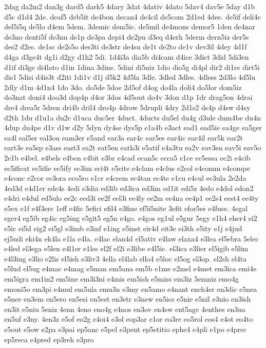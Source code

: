 {2dag
da2m2
dan3g
dard5
dark5
4dary
3dat
4dativ
4dato
5dav4
dav5e
5day
d1b
d5c
d1d4
2de.
deaf5
deb5it
de4bon
decan4
de4cil
de5com
2d1ed
4dee.
de5if
deli4e
del5i5q
de5lo
d4em
5dem.
3demic
dem5ic.
de5mil
de4mons
demor5
1den
de4nar
de3no
denti5f
de3nu
de1p
de3pa
depi4
de2pu
d3eq
d4erh
5derm
dern5iz
der5s
des2
d2es.
de1sc
de2s5o
des3ti
de3str
de4su
de1t
de2to
de1v
dev3il
4dey
4d1f
d4ga
d3ge4t
dg1i
d2gy
d1h2
5di.
1d4i3a
dia5b
di4cam
d4ice
3dict
3did
5di3en
d1if
di3ge
di4lato
d1in
1dina
3dine.
5dini
di5niz
1dio
dio5g
di4pl
dir2
di1re
dirt5i
dis1
5disi
d4is3t
d2iti
1di1v
d1j
d5k2
4d5la
3dle.
3dled
3dles.
4dless
2d3lo
4d5lu
2dly
d1m
4d1n4
1do
3do.
do5de
5doe
2d5of
d4og
do4la
doli4
do5lor
dom5iz
do3nat
doni4
doo3d
dop4p
d4or
3dos
4d5out
do4v
3dox
d1p
1dr
drag5on
4drai
dre4
drea5r
5dren
dri4b
dril4
dro4p
4drow
5drupli
4dry
2d1s2
ds4p
d4sw
d4sy
d2th
1du
d1u1a
du2c
d1uca
duc5er
4duct.
4ducts
du5el
du4g
d3ule
dum4be
du4n
4dup
du4pe
d1v
d1w
d2y
5dyn
dy4se
dys5p
e1a4b
e3act
ead1
ead5ie
ea4ge
ea5ger
ea4l
eal5er
eal3ou
eam3er
e5and
ear3a
ear4c
ear5es
ear4ic
ear4il
ear5k
ear2t
eart3e
ea5sp
e3ass
east3
ea2t
eat5en
eath3i
e5atif
e4a3tu
ea2v
eav3en
eav5i
eav5o
2e1b
e4bel.
e4bels
e4ben
e4bit
e3br
e4cad
ecan5c
ecca5
e1ce
ec5essa
ec2i
e4cib
ec5ificat
ec5ifie
ec5ify
ec3im
eci4t
e5cite
e4clam
e4clus
e2col
e4comm
e4compe
e4conc
e2cor
ec3ora
eco5ro
e1cr
e4crem
ec4tan
ec4te
e1cu
e4cul
ec3ula
2e2da
4ed3d
e4d1er
ede4s
4edi
e3dia
ed3ib
ed3ica
ed3im
ed1it
edi5z
4edo
e4dol
edon2
e4dri
e4dul
ed5ulo
ee2c
eed3i
ee2f
eel3i
ee4ly
ee2m
ee4na
ee4p1
ee2s4
eest4
ee4ty
e5ex
e1f
e4f3ere
1eff
e4fic
5efici
efil4
e3fine
ef5i5nite
3efit
efor5es
e4fuse.
4egal
eger4
eg5ib
eg4ic
eg5ing
e5git5
eg5n
e4go.
e4gos
eg1ul
e5gur
5egy
e1h4
eher4
ei2
e5ic
ei5d
eig2
ei5gl
e3imb
e3inf
e1ing
e5inst
eir4d
eit3e
ei3th
e5ity
e1j
e4jud
ej5udi
eki4n
ek4la
e1la
e4la.
e4lac
elan4d
el5ativ
e4law
elaxa4
e3lea
el5ebra
5elec
e4led
el3ega
e5len
e4l1er
e1les
el2f
el2i
e3libe
e4l5ic.
el3ica
e3lier
el5igib
e5lim
e4l3ing
e3lio
e2lis
el5ish
e3liv3
4ella
el4lab
ello4
e5loc
el5og
el3op.
el2sh
el4ta
e5lud
el5ug
e4mac
e4mag
e5man
em5ana
em5b
e1me
e2mel
e4met
em3ica
emi4e
em5igra
em1in2
em5ine
em3i3ni
e4mis
em5ish
e5miss
em3iz
5emniz
emo4g
emoni5o
em3pi
e4mul
em5ula
emu3n
e3my
en5amo
e4nant
ench4er
en3dic
e5nea
e5nee
en3em
en5ero
en5esi
en5est
en3etr
e3new
en5ics
e5nie
e5nil
e3nio
en3ish
en3it
e5niu
5eniz
4enn
4eno
eno4g
e4nos
en3ov
en4sw
ent5age
4enthes
en3ua
en5uf
e3ny.
4en3z
e5of
eo2g
e4oi4
e3ol
eop3ar
e1or
eo3re
eo5rol
eos4
e4ot
eo4to
e5out
e5ow
e2pa
e3pai
ep5anc
e5pel
e3pent
ep5etitio
ephe4
e4pli
e1po
e4prec
ep5reca
e4pred
ep3reh
e3pro
}
